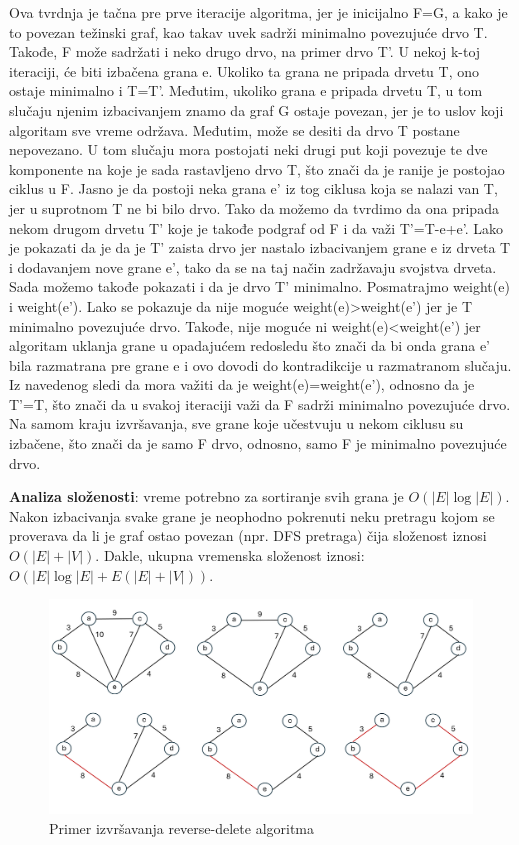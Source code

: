 \documentclass[12pt,oneside]{memoir}
\begin{document}
Ova tvrdnja je tačna pre prve iteracije algoritma, jer je inicijalno F=G, a kako je to povezan težinski graf, kao takav uvek sadrži minimalno povezujuće drvo T. Takođe, F može sadržati i neko drugo drvo, na primer drvo T'. U nekoj k-toj iteraciji, će biti izbačena grana e. Ukoliko ta grana ne pripada drvetu T, ono ostaje minimalno i T=T'. Međutim, ukoliko grana e pripada drvetu T, u tom slučaju njenim izbacivanjem znamo da graf G ostaje povezan, jer je to uslov koji algoritam sve vreme održava. Međutim, može se desiti da drvo T postane nepovezano. U tom slučaju mora postojati neki drugi put koji povezuje te dve komponente na koje je sada rastavljeno drvo T, što znači da je ranije je postojao ciklus u F. Jasno je da postoji neka grana e' iz tog ciklusa koja se nalazi van T, jer u suprotnom T ne bi bilo drvo. Tako da možemo da tvrdimo da ona pripada nekom drugom drvetu T' koje je takođe podgraf od F i da važi T'=T-e+e'. Lako je pokazati da je da je T' zaista drvo jer nastalo izbacivanjem grane e iz drveta T i dodavanjem nove grane e', tako da se na taj način zadržavaju svojstva drveta. Sada možemo takođe pokazati i da je drvo T' minimalno. Posmatrajmo weight(e) i weight(e'). Lako se pokazuje da nije moguće weight(e)>weight(e') jer je T minimalno povezujuće drvo. Takođe, nije moguće ni weight(e)<weight(e') jer algoritam uklanja grane u opadajućem redosledu što znači da bi onda grana e' bila razmatrana pre grane e i ovo dovodi do kontradikcije u razmatranom slučaju. Iz navedenog sledi da mora važiti da je weight(e)=weight(e'), odnosno da je T'=T, što znači da u svakoj iteraciji važi da F sadrži minimalno povezujuće drvo. Na samom kraju izvršavanja, sve grane koje učestvuju u nekom ciklusu su izbačene, što znači da je samo F drvo, odnosno, samo F je minimalno povezujuće drvo.

\textbf{Analiza složenosti}: vreme potrebno za sortiranje svih grana je \( O(|E|\log |E|) \). Nakon izbacivanja svake grane je neophodno pokrenuti neku pretragu kojom se proverava da li je graf ostao povezan (npr. DFS pretraga) čija složenost iznosi \( O(|E|+|V|) \). Dakle, ukupna vremenska složenost iznosi: \( O(|E|\log |E| + E(|E|+|V|))\).

\begin{figure}[!ht]
  \centering
  \label{fig:ReverseDelete}
  \includegraphics[width=1.0\textwidth]{matfmaster/ReverseDeleteAlgo.png}
  \caption{Primer izvršavanja reverse-delete algoritma}
\end{figure}
\end{document}
